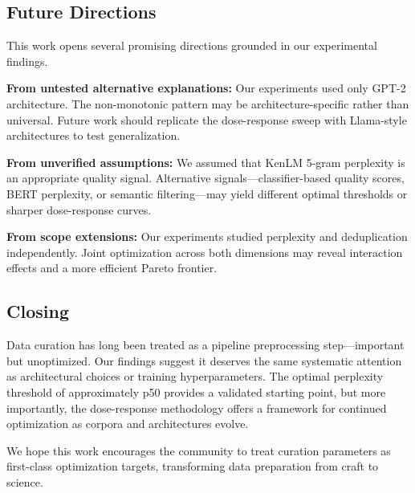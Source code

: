 \subsection{Future Directions}

This work opens several promising directions grounded in our experimental findings.

\textbf{From untested alternative explanations:} Our experiments used only GPT-2 architecture. The non-monotonic pattern may be architecture-specific rather than universal. Future work should replicate the dose-response sweep with Llama-style architectures to test generalization.

\textbf{From unverified assumptions:} We assumed that KenLM 5-gram perplexity is an appropriate quality signal. Alternative signals---classifier-based quality scores, BERT perplexity, or semantic filtering---may yield different optimal thresholds or sharper dose-response curves.

\textbf{From scope extensions:} Our experiments studied perplexity and deduplication independently. Joint optimization across both dimensions may reveal interaction effects and a more efficient Pareto frontier.

\subsection{Closing}

Data curation has long been treated as a pipeline preprocessing step---important but unoptimized. Our findings suggest it deserves the same systematic attention as architectural choices or training hyperparameters. The optimal perplexity threshold of approximately p50 provides a validated starting point, but more importantly, the dose-response methodology offers a framework for continued optimization as corpora and architectures evolve.

We hope this work encourages the community to treat curation parameters as first-class optimization targets, transforming data preparation from craft to science.
